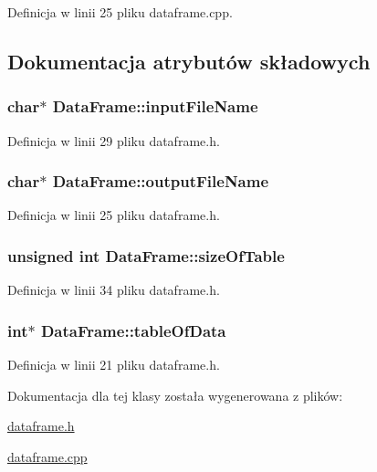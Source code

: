 Definicja w linii 25 pliku dataframe.\-cpp.



\subsection{Dokumentacja atrybutów składowych}
\hypertarget{class_data_frame_a90041bfdf474b0d7ce39bc3dbbb55aa9}{
\subsubsection[{input\-File\-Name}]{\setlength{\rightskip}{0pt plus 5cm}char$\ast$ Data\-Frame\-::input\-File\-Name}}\label{class_data_frame_a90041bfdf474b0d7ce39bc3dbbb55aa9}


Definicja w linii 29 pliku dataframe.\-h.

\hypertarget{class_data_frame_a824a73f019aec71281837abafd95a510}{
\subsubsection[{output\-File\-Name}]{\setlength{\rightskip}{0pt plus 5cm}char$\ast$ Data\-Frame\-::output\-File\-Name}}\label{class_data_frame_a824a73f019aec71281837abafd95a510}


Definicja w linii 25 pliku dataframe.\-h.

\hypertarget{class_data_frame_aa5d1905c6910cad07ab5189bd34b13ab}{
\subsubsection[{size\-Of\-Table}]{\setlength{\rightskip}{0pt plus 5cm}unsigned int Data\-Frame\-::size\-Of\-Table}}\label{class_data_frame_aa5d1905c6910cad07ab5189bd34b13ab}


Definicja w linii 34 pliku dataframe.\-h.

\hypertarget{class_data_frame_a8edc4ce524483e2e5069067267ccdcbf}{
\subsubsection[{table\-Of\-Data}]{\setlength{\rightskip}{0pt plus 5cm}int$\ast$ Data\-Frame\-::table\-Of\-Data}}\label{class_data_frame_a8edc4ce524483e2e5069067267ccdcbf}


Definicja w linii 21 pliku dataframe.\-h.



Dokumentacja dla tej klasy została wygenerowana z plików\-:\begin{DoxyCompactItemize}
\item 
\hyperlink{dataframe_8h}{dataframe.\-h}\item 
\hyperlink{dataframe_8cpp}{dataframe.\-cpp}\end{DoxyCompactItemize}
